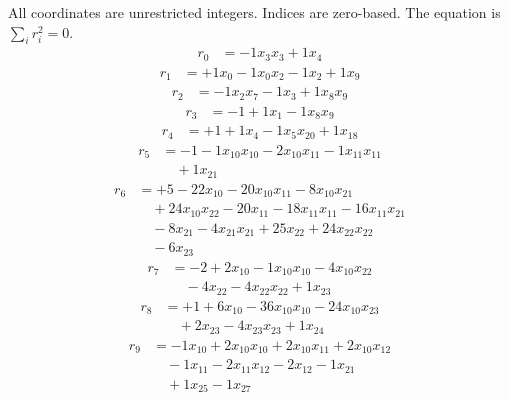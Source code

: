 \begingroup\small
All coordinates are unrestricted integers. Indices are zero-based. The equation is $\sum_i r_i^2=0$.
\[\begin{aligned}
r_{0} &= - 1 x_{3} x_{3} + 1 x_{4}
\end{aligned}\]
\[\begin{aligned}
r_{1} &= + 1 x_{0} - 1 x_{0} x_{2} - 1 x_{2} + 1 x_{9}
\end{aligned}\]
\[\begin{aligned}
r_{2} &= - 1 x_{2} x_{7} - 1 x_{3} + 1 x_{8} x_{9}
\end{aligned}\]
\[\begin{aligned}
r_{3} &= - 1 + 1 x_{1} - 1 x_{8} x_{9}
\end{aligned}\]
\[\begin{aligned}
r_{4} &= + 1 + 1 x_{4} - 1 x_{5} x_{20} + 1 x_{18}
\end{aligned}\]
\[\begin{aligned}
r_{5} &= - 1 - 1 x_{10} x_{10} - 2 x_{10} x_{11} - 1 x_{11} x_{11} \\
 &\quad + 1 x_{21}
\end{aligned}\]
\[\begin{aligned}
r_{6} &= + 5 - 22 x_{10} - 20 x_{10} x_{11} - 8 x_{10} x_{21} \\
 &\quad + 24 x_{10} x_{22} - 20 x_{11} - 18 x_{11} x_{11} - 16 x_{11} x_{21} \\
 &\quad - 8 x_{21} - 4 x_{21} x_{21} + 25 x_{22} + 24 x_{22} x_{22} \\
 &\quad - 6 x_{23}
\end{aligned}\]
\[\begin{aligned}
r_{7} &= - 2 + 2 x_{10} - 1 x_{10} x_{10} - 4 x_{10} x_{22} \\
 &\quad - 4 x_{22} - 4 x_{22} x_{22} + 1 x_{23}
\end{aligned}\]
\[\begin{aligned}
r_{8} &= + 1 + 6 x_{10} - 36 x_{10} x_{10} - 24 x_{10} x_{23} \\
 &\quad + 2 x_{23} - 4 x_{23} x_{23} + 1 x_{24}
\end{aligned}\]
\[\begin{aligned}
r_{9} &= - 1 x_{10} + 2 x_{10} x_{10} + 2 x_{10} x_{11} + 2 x_{10} x_{12} \\
 &\quad - 1 x_{11} - 2 x_{11} x_{12} - 2 x_{12} - 1 x_{21} \\
 &\quad + 1 x_{25} - 1 x_{27}
\end{aligned}\]
